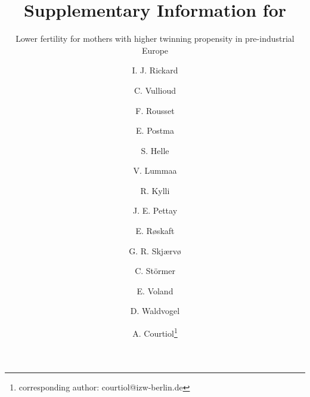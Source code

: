 \documentclass[a4paper]{article}\usepackage[]{graphicx}\usepackage[]{color}
\title{Supplementary Information for}
\subtitle{Lower fertility for mothers with higher twinning propensity in pre-industrial Europe}
\author{I. J. Rickard \and C. Vullioud \and F. Rousset \and E. Postma \and S.
Helle \and V. Lummaa \and R. Kylli \and J. E. Pettay \and E.
Røskaft \and G. R. Skjærvø \and C. Störmer \and E. Voland \and D.
Waldvogel \and A. Courtiol\footnote{corresponding author: courtiol@izw-berlin.de}}
\date{}
\begin{document}
\renewcommand{\thetable}{S\arabic{table}}
\renewcommand{\thefigure}{S\arabic{figure}}



\maketitle

\tableofcontents

\newpage

\listoffigures

\newpage

\listoftables

\newpage

%
%
\end{document}
